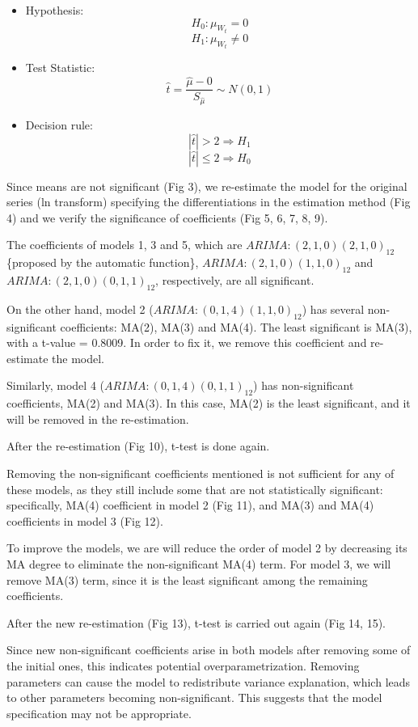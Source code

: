 \documentclass[
]{article}
\begin{document}
\begin{itemize}
\item
  Hypothesis: \[H_0 : \mu_{W_t} = 0\] \[H_1 : \mu_{W_t} \neq 0\]
\item
  Test Statistic:
  \[\hat{t} = \frac{\hat{\mu} - 0}{S_{\hat{\mu}}} \sim N(0,1)\]
\item
  Decision rule: \[|\hat{t}| > 2 \Rightarrow H_1\]
  \[|\hat{t}| \leq 2 \Rightarrow H_0\]
\end{itemize}

Since means are not significant (Fig 3), we re-estimate the model for
the original series (ln transform) specifying the differentiations in
the estimation method (Fig 4) and we verify the significance of
coefficients (Fig 5, 6, 7, 8, 9).

The coefficients of models 1, 3 and 5, which are
\(ARIMA: (2, 1, 0)(2, 1, 0)_{12}\) \{proposed by the automatic
function\}, \(ARIMA: (2, 1, 0)(1, 1, 0)_{12}\) and
\(ARIMA: (2, 1, 0)(0, 1, 1)_{12}\), respectively, are all significant.

On the other hand, model 2 (\(ARIMA: (0, 1, 4)(1, 1, 0)_{12}\)) has
several non-significant coefficients: MA(2), MA(3) and MA(4). The least
significant is MA(3), with a t-value = 0.8009. In order to fix it, we
remove this coefficient and re-estimate the model.

Similarly, model 4 (\(ARIMA: (0, 1, 4)(0, 1, 1)_{12}\)) has
non-significant coefficients, MA(2) and MA(3). In this case, MA(2) is
the least significant, and it will be removed in the re-estimation.

After the re-estimation (Fig 10), t-test is done again.

Removing the non-significant coefficients mentioned is not sufficient
for any of these models, as they still include some that are not
statistically significant: specifically, MA(4) coefficient in model 2
(Fig 11), and MA(3) and MA(4) coefficients in model 3 (Fig 12).

To improve the models, we are will reduce the order of model 2 by
decreasing its MA degree to eliminate the non-significant MA(4) term.
For model 3, we will remove MA(3) term, since it is the least
significant among the remaining coefficients.

After the new re-estimation (Fig 13), t-test is carried out again (Fig
14, 15).

Since new non-significant coefficients arise in both models after
removing some of the initial ones, this indicates potential
overparametrization. Removing parameters can cause the model to
redistribute variance explanation, which leads to other parameters
becoming non-significant. This suggests that the model specification may
not be appropriate.
\end{document}
